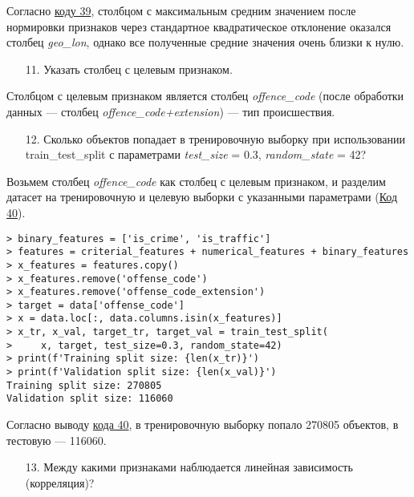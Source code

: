 Согласно \hyperref[code:39]{коду 39}, столбцом с максимальным средним значением после нормировки признаков через стандартное квадратическое отклонение оказался столбец \textit{geo\_lon}, однако все полученные средние значения очень близки к нулю.

\begin{enumerate}
    \item[11.] Указать столбец с целевым признаком.
\end{enumerate}

Столбцом с целевым признаком является столбец \textit{offence\_code} (после обработки данных --- столбец \textit{offence\_code+extension}) --- тип происшествия.

\begin{enumerate}
    \item[12.] Сколько объектов попадает в тренировочную выборку при использовании train\_test\_split с параметрами \textit{test\_size} = 0.3, \textit{random\_state} = 42?
\end{enumerate}

Возьмем столбец \textit{offence\_code} как столбец с целевым признаком, и разделим датасет на тренировочную и целевую выборки с указанными параметрами (\hyperref[code:40]{Код 40}).

\begin{code}
\begin{verbatim}
> binary_features = ['is_crime', 'is_traffic']
> features = criterial_features + numerical_features + binary_features
> x_features = features.copy()
> x_features.remove('offense_code')
> x_features.remove('offense_code_extension')
> target = data['offense_code']
> x = data.loc[:, data.columns.isin(x_features)]
> x_tr, x_val, target_tr, target_val = train_test_split(
>     x, target, test_size=0.3, random_state=42)
> print(f'Training split size: {len(x_tr)}')
> print(f'Validation split size: {len(x_val)}')
Training split size: 270805
Validation split size: 116060
\end{verbatim}
\label{code:40}
\end{code}

Согласно выводу \hyperref[code:40]{кода 40}, в тренировочную выборку попало 270805 объектов, в тестовую --- 116060.

\begin{enumerate}
    \item[13.] Между какими признаками наблюдается линейная зависимость (корреляция)?
\end{enumerate}

